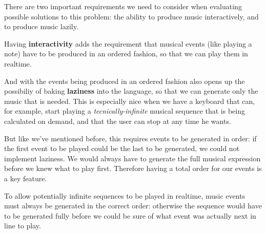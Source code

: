 \documentclass[a4paper,UKenglish,cleveref, autoref]{oasics-v2019}
\begin{document}
There are two important requirements we need to consider when evaluating possible solutions to this problem: the ability to produce music interactively, and to produce music lazily.

Having \textbf{interactivity} adds the requirement that musical events (like playing a note) have to be produced in an ordered fashion, so that we can play them in realtime.

And with the events being produced in an ordered fashion also opens up the possibiliy of baking \textbf{laziness} into the language, so that we can generate only the music that is needed. This is especially nice when we have a keyboard that can, for example, start playing a \textit{tecnically-infinite} musical sequence that is being calculated on demand, and that the user can stop at any time he wants.

But like we've mentioned before, this requires events to be generated in order: if the first event to be played could be the last to be generated, we could not implement laziness. We would always have to generate the full musical expression before we knew what to play first. Therefore having a total order for our events is a key feature.

\begin{claim}
\label{claim:total-order} To allow potentially infinite sequences to be played in realtime, music events must always be generated in the correct order: otherwise the sequence would have to be generated fully before we could be sure of what event was actually next in line to play.
\end{claim}
\end{document}
